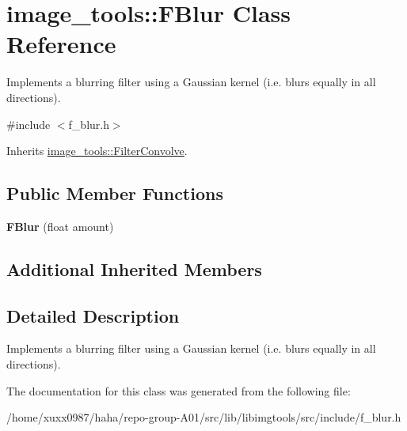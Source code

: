 \hypertarget{classimage__tools_1_1FBlur}{}\section{image\+\_\+tools\+:\+:F\+Blur Class Reference}
\label{classimage__tools_1_1FBlur}


Implements a blurring filter using a Gaussian kernel (i.\+e. blurs equally in all directions).  




{\ttfamily \#include $<$f\+\_\+blur.\+h$>$}



Inherits \hyperlink{classimage__tools_1_1FilterConvolve}{image\+\_\+tools\+::\+Filter\+Convolve}.

\subsection*{Public Member Functions}
\begin{DoxyCompactItemize}
\item 
{\bfseries F\+Blur} (float amount)\hypertarget{classimage__tools_1_1FBlur_a0237596cbd706a38d71e517c0291d3d1}{}\label{classimage__tools_1_1FBlur_a0237596cbd706a38d71e517c0291d3d1}

\end{DoxyCompactItemize}
\subsection*{Additional Inherited Members}


\subsection{Detailed Description}
Implements a blurring filter using a Gaussian kernel (i.\+e. blurs equally in all directions). 

The documentation for this class was generated from the following file\+:\begin{DoxyCompactItemize}
\item 
/home/xuxx0987/haha/repo-\/group-\/\+A01/src/lib/libimgtools/src/include/f\+\_\+blur.\+h\end{DoxyCompactItemize}
